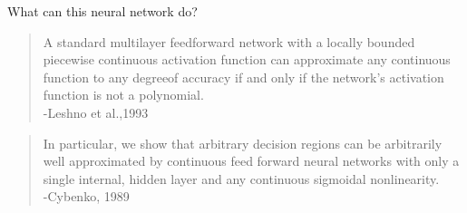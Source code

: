 \begin{frame}{What can this neural network do?}
\begin{quote}
	{\small
		A standard multilayer feedforward network with a locally bounded 
		piecewise continuous activation function can approximate any continuous 
		function to any degreeof accuracy if and only if the network's activation 
		function is not a polynomial.\\
		-Leshno et al.,1993
	}
\end{quote}
\begin{quote}
	{\small 
	In particular, we show that arbitrary decision regions can
	be arbitrarily well approximated by continuous feed forward neural networks with
	only a single internal, hidden layer and any continuous sigmoidal nonlinearity.\\
	-Cybenko, 1989 
	}
\end{quote}
\end{frame}
